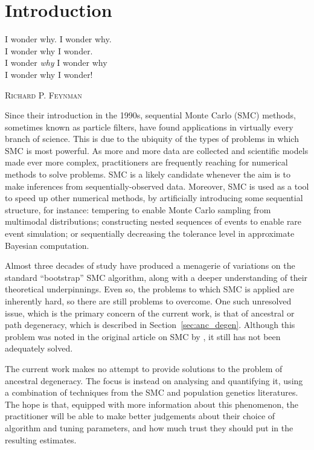 \chapter{Introduction}

\epigraph{
I wonder why. I wonder why.\\
I wonder why I wonder.\\
I wonder \emph{why} I wonder why\\
I wonder why I wonder!
}
{\textsc{Richard P. Feynman}}

Since their introduction in the 1990s, sequential Monte Carlo (SMC) methods, sometimes known as particle filters, have found applications in virtually every branch of science. 
This is due to the ubiquity of the types of problems in which SMC is most powerful.
As more and more data are collected and scientific models made ever more complex, practitioners are frequently reaching for numerical methods to solve problems.
SMC is a likely candidate whenever the aim is to make inferences from sequentially-observed data.
Moreover, SMC is used as a tool to speed up other numerical methods, by artificially introducing some sequential structure, for instance: tempering to enable Monte Carlo sampling from multimodal distributions; constructing nested sequences of events to enable rare event simulation; or sequentially decreasing the tolerance level in approximate Bayesian computation.

Almost three decades of study have produced a menagerie of variations on the standard ``bootstrap'' SMC algorithm, along with a deeper understanding of their theoretical underpinnings.
Even so, the problems to which SMC is applied are inherently hard,
so there are still problems to overcome.
One such unresolved issue, which is the primary concern of the current work, is that of ancestral or path degeneracy, which is described in Section~\ref{sec:anc_degen}. Although this problem was noted in the original article on SMC by \textcite{gordon1993}, it still has not been adequately solved.

The current work makes no attempt to provide solutions to the problem of ancestral degeneracy. The focus is instead on analysing and quantifying it, using a combination of techniques from the SMC and population genetics literatures. 
The hope is that, equipped with more information about this phenomenon, the practitioner will be able to make better judgements about their choice of algorithm and tuning parameters, and how much trust they should put in the resulting estimates.
\\
\vspace*{10pt}

